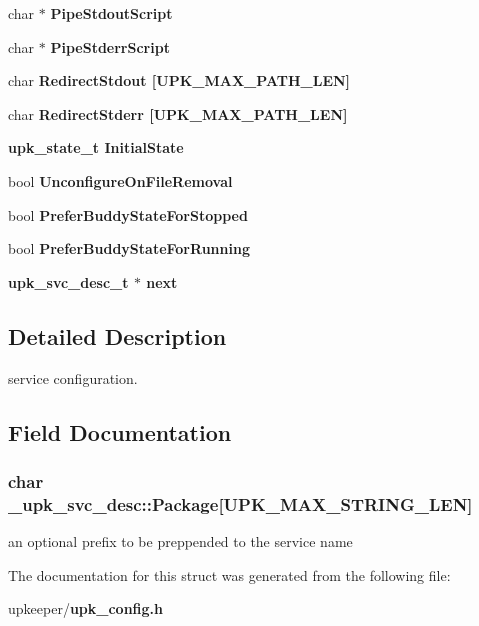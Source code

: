 \begin{CompactItemize}
\item 
char $\ast$ \bf{Pipe\-Stdout\-Script}
\item 
char $\ast$ \bf{Pipe\-Stderr\-Script}
\item 
char \bf{Redirect\-Stdout} [UPK\_\-MAX\_\-PATH\_\-LEN]
\item 
char \bf{Redirect\-Stderr} [UPK\_\-MAX\_\-PATH\_\-LEN]
\item 
\bf{upk\_\-state\_\-t} \bf{Initial\-State}
\item 
bool \bf{Unconfigure\-On\-File\-Removal}
\item 
bool \bf{Prefer\-Buddy\-State\-For\-Stopped}
\item 
bool \bf{Prefer\-Buddy\-State\-For\-Running}
\item 
\bf{upk\_\-svc\_\-desc\_\-t} $\ast$ \bf{next}
\end{CompactItemize}


\subsection{Detailed Description}
service configuration. 



\subsection{Field Documentation}
\subsubsection{\setlength{\rightskip}{0pt plus 5cm}char \bf{\_\-upk\_\-svc\_\-desc::Package}[UPK\_\-MAX\_\-STRING\_\-LEN]}\label{struct__upk__svc__desc_5e1563eff5960c2c5228bfe8325ea583}


an optional prefix to be preppended to the service name 

The documentation for this struct was generated from the following file:\begin{CompactItemize}
\item 
upkeeper/\bf{upk\_\-config.h}\end{CompactItemize}
